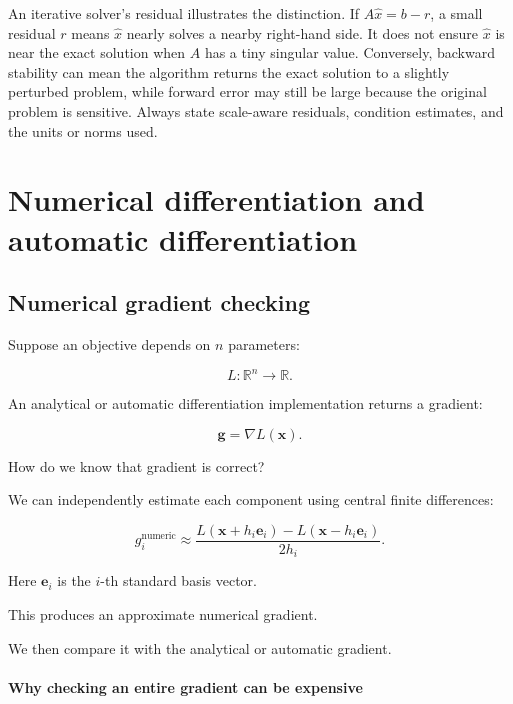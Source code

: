 An iterative solver's residual illustrates the distinction. If \(A\hat x=b-r\), a small residual \(r\) means \(\hat x\) nearly solves a nearby right-hand side. It does not ensure \(\hat x\) is near the exact solution when \(A\) has a tiny singular value. Conversely, backward stability can mean the algorithm returns the exact solution to a slightly perturbed problem, while forward error may still be large because the original problem is sensitive. Always state scale-aware residuals, condition estimates, and the units or norms used.

\section{Numerical differentiation and automatic differentiation}\label{02-foundations-ii-ch022-numerical-differentiation-and-automatic-differentiation}

\hypertarget{02-foundations-ii-ch022-numerical-differentiation-and-automatic-differentiation}{}

\subsection{Numerical gradient checking}\label{02-foundations-ii-ch022-numerical-gradient-checking}

\hypertarget{02-foundations-ii-ch022-numerical-gradient-checking}{}

Suppose an objective depends on \(n\) parameters:

\[
L:\mathbb R^n\rightarrow\mathbb R.
\]

An analytical or automatic differentiation implementation returns a gradient:

\[
\mathbf g= \nabla L(\mathbf x).
\]

How do we know that gradient is correct?

We can independently estimate each component using central finite differences:

\[
\boxed{ g_i^{\mathrm{numeric}} \approx \frac{ L(\mathbf x+h_i\mathbf e_i)- L(\mathbf x-h_i\mathbf e_i) }{2h_i} }.
\]

Here \(\mathbf e_i\) is the \(i\)-th standard basis vector.

This produces an approximate numerical gradient.

We then compare it with the analytical or automatic gradient.

\paragraph{Why checking an entire gradient can be expensive}\label{02-foundations-ii-ch022-why-checking-an-entire-gradient-can-be-expensive}

